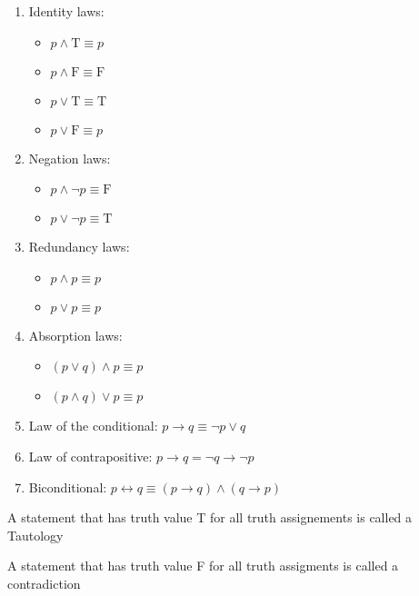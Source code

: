 \documentclass{article}
\begin{document}
\begin{proposition}
\begin{enumerate}
	\item Identity laws:
	    \begin{itemize}
		\item $p \wedge \mathrm{T} \equiv p $
		\item $ p \wedge \mathrm{F} \equiv \mathrm{F} $
		\item $p \vee \mathrm{T} \equiv \mathrm{T} \quad$
		\item $p \vee \mathrm{F} \equiv p$
	    \end{itemize}
	\item Negation laws:
	    \begin{itemize}
		\item $ p \wedge \neg p \equiv \mathrm{F} $
		\item $ p \vee \neg p \equiv \mathrm{T}$
	    \end{itemize}
	\item Redundancy laws:
	    \begin{itemize}
		\item $p \wedge p \equiv p$
		\item $ p \vee p \equiv p$
	    \end{itemize}
	\item Absorption laws:
	    \begin{itemize}
		\item $(p \vee q) \wedge p \equiv p $
		\item $(p \wedge q) \vee p \equiv p$
	    \end{itemize}
	\item Law of the conditional:  $p \rightarrow q \equiv \neg p \vee q$
	\item Law of contrapositive: $p \rightarrow q=\neg q \rightarrow \neg p$
	\item Biconditional: $p \leftrightarrow q \equiv(p \rightarrow q) \wedge(q \rightarrow p)$
    \end{enumerate}
\end{proposition}

\begin{definition}[Tautology]
    A statement that has truth value T for all truth assignements is
    called a Tautology
\end{definition}

\begin{definition}[Contradiction]
    A statement that has truth value F for all truth assigments is called
    a contradiction
\end{definition}
\end{document}
